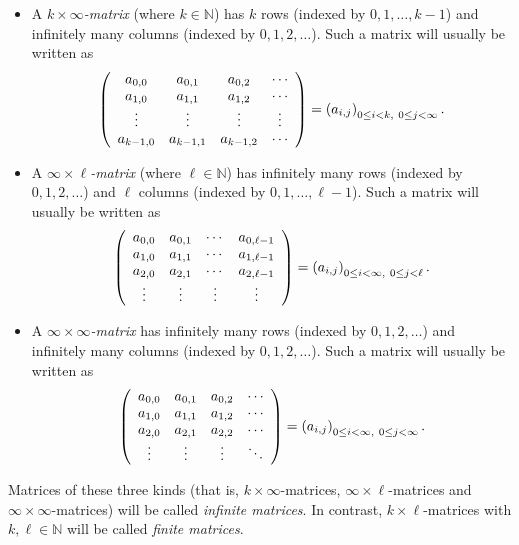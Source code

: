 \documentclass[numbers=enddot,12pt,final,onecolumn,notitlepage]{scrartcl}%
\theoremstyle{definition}
\begin{document}
\begin{itemize}
\item A $k\times\infty$\textit{-matrix} (where $k\in\mathbb{N}$) has $k$ rows
(indexed by $0,1,\ldots,k-1$) and infinitely many columns (indexed by
$0,1,2,\ldots$). Such a matrix will usually be written as%
\[
\left(
\begin{array}
[c]{cccc}%
a_{0,0} & a_{0,1} & a_{0,2} & \cdots\\
a_{1,0} & a_{1,1} & a_{1,2} & \cdots\\
\vdots & \vdots & \vdots & \vdots\\
a_{k-1,0} & a_{k-1,1} & a_{k-1,2} & \cdots
\end{array}
\right)  =\left(  a_{i,j}\right)  _{0\leq i<k,\ 0\leq j<\infty}.
\]


\item A $\infty\times\ell$\textit{-matrix} (where $\ell\in\mathbb{N}$) has
infinitely many rows (indexed by $0,1,2,\ldots$) and $\ell$ columns (indexed
by $0,1,\ldots,\ell-1$). Such a matrix will usually be written as%
\[
\left(
\begin{array}
[c]{cccc}%
a_{0,0} & a_{0,1} & \cdots & a_{0,\ell-1}\\
a_{1,0} & a_{1,1} & \cdots & a_{1,\ell-1}\\
a_{2,0} & a_{2,1} & \cdots & a_{2,\ell-1}\\
\vdots & \vdots & \vdots & \vdots
\end{array}
\right)  =\left(  a_{i,j}\right)  _{0\leq i<\infty,\ 0\leq j<\ell}.
\]


\item A $\infty\times\infty$\textit{-matrix} has infinitely many rows (indexed
by $0,1,2,\ldots$) and infinitely many columns (indexed by $0,1,2,\ldots$).
Such a matrix will usually be written as%
\[
\left(
\begin{array}
[c]{cccc}%
a_{0,0} & a_{0,1} & a_{0,2} & \cdots\\
a_{1,0} & a_{1,1} & a_{1,2} & \cdots\\
a_{2,0} & a_{2,1} & a_{2,2} & \cdots\\
\vdots & \vdots & \vdots & \ddots
\end{array}
\right)  =\left(  a_{i,j}\right)  _{0\leq i<\infty,\ 0\leq j<\infty}.
\]

\end{itemize}

Matrices of these three kinds (that is, $k\times\infty$-matrices,
$\infty\times\ell$-matrices and $\infty\times\infty$-matrices) will be called
\textit{infinite matrices}. In contrast, $k\times\ell$-matrices with
$k,\ell\in\mathbb{N}$ will be called \textit{finite matrices}.
\end{document}
